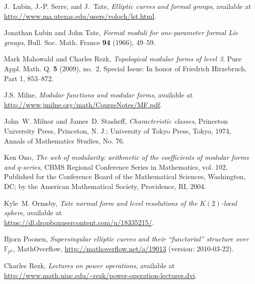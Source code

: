 \documentclass{gtpart}
\theoremstyle{definition}
\theoremstyle{remark}
\newcommand{\mb}[1]{\mathbb{#1}}
\newcommand{\BF}{{\mb F}}
\renewcommand{\=}{\approx}
\renewcommand{\-}{\sim}
\numberwithin{equation}{section}
\begin{document}
\begin{thebibliography}
J.~Lubin, J.-P. Serre, and J.~Tate, \emph{Elliptic curves and formal groups}, 
  available at \href{http://www.ma.utexas.edu/users/voloch/lst.html}
  {http://www.ma.utexas.edu/users/voloch/lst.html}.

Jonathan Lubin and John Tate, \emph{Formal moduli for one-parameter formal
  {L}ie groups}, Bull. Soc. Math. France \textbf{94} (1966), 49--59.

Mark Mahowald and Charles Rezk, \emph{Topological modular forms of level 3},
  Pure Appl. Math. Q. \textbf{5} (2009), no.~2, Special Issue: In honor of
  Friedrich Hirzebruch. Part 1, 853--872. 

J.S. Milne, \emph{Modular functions and modular forms}, available at \\
  \href{http://www.jmilne.org/math/CourseNotes/MF.pdf}
  {http://www.jmilne.org/math/CourseNotes/MF.pdf}.

John~W. Milnor and James~D. Stasheff, \emph{Characteristic classes}, Princeton
  University Press, Princeton, N. J.; University of Tokyo Press, Tokyo, 1974,
  Annals of Mathematics Studies, No. 76. 

Ken Ono, \emph{The web of modularity: arithmetic of the coefficients of modular
  forms and {$q$}-series}, CBMS Regional Conference Series in Mathematics, vol.
  102, Published for the Conference Board of the Mathematical Sciences,
  Washington, DC; by the American Mathematical Society, Providence, RI, 2004.

Kyle~M. Ormsby, \emph{Tate normal form and level resolutions of the
  {$K(2)$}-local sphere}, available at \\
  \href{https://dl.dropboxusercontent.com/u/18335215/\name}
  {https://dl.dropboxusercontent.com/u/18335215/\name}.

Bjorn Poonen,
  \emph{Supersingular elliptic curves and their ``functorial'' structure over 
  $\BF_{p^2}$}, MathOverflow, \href{http://mathoverflow.net/a/19013}
  {http://mathoverflow.net/a/19013} (version: 2010-03-22).

Charles Rezk, \emph{Lectures on power operations}, available at \\
  \href{http://www.math.uiuc.edu/~rezk/power-operation-lectures.dvi}
  {http://www.math.uiuc.edu/\textasciitilde rezk/power-operation-lectures.dvi}.


\end{thebibliography}
\end{document}
